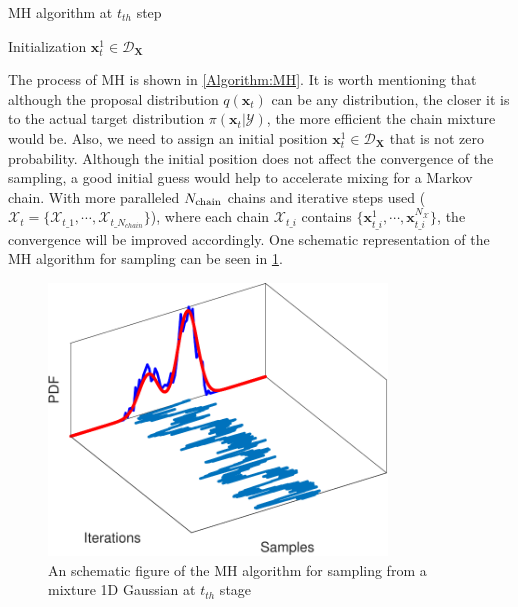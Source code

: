 \begin{algorithm}
    \caption{\acrlong{MH} algorithm at $t_{th}$ step}
    \label{Algorithm:MH}
    Initialization $\boldsymbol{x}_{t}^{1} \in \mathcal{D}_{\bm{X}}$\; 
\end{algorithm}
The process of \acrshort{MH} is shown in \ref{Algorithm:MH}. It is worth mentioning that although the proposal distribution $q(\boldsymbol{x}_{t})$ can be any distribution, the closer it is to the actual target distribution $\pi(\boldsymbol{x}_{t}|\mathcal{Y})$, the more efficient the chain mixture would be. Also, we need to assign an initial position $\boldsymbol{x}_{t}^{1} \in \mathcal{D}_{\bm{X}}$ that is not zero probability. Although the initial position does not affect the convergence of the sampling, a good initial guess would help to accelerate mixing for a Markov chain. With more paralleled $N_{\rm{chain}}$ chains and iterative steps used ($\mathcal{X}_{t} = \{ \mathcal{X}_{t\_1},\cdots,\mathcal{X}_{t\_N_{chain}}\}$), where each chain $\mathcal{X}_{t\_i}$ contains $\{ \boldsymbol{x}_{t\_i}^{1},\cdots,\boldsymbol{x}_{t\_i}^{N_{\mathcal{X}}}\}$, the convergence will be improved accordingly. One schematic representation of the \acrshort{MH} algorithm for sampling can be seen in \cref{fig: MH_example}.
\begin{figure}[htbp]
    \centering
    \includegraphics[width = 90mm]{Figures/figure-MCMC_sampling.pdf}
\caption{An schematic figure of the \acrshort{MH} algorithm for sampling from a mixture 1D Gaussian at $t_{th}$ stage}
\label{fig: MH_example}
\end{figure}
